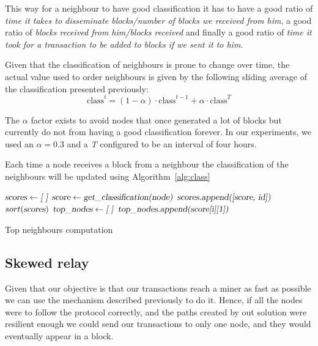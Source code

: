 \documentclass{dads}   %
\begin{document}
This way for a neighbour to have good classification it has to have a good ratio of \textsl{time it takes to disseminate blocks/number of blocks we received from him}, a good ratio of \textsl{blocks received from him/blocks received} and finally a good ratio of \textsl{time it took for a transaction to be added to blocks if we sent it to him}.

Given that the classification of neighbours is prone to change over time, the actual value used to order neighbours is given by the following sliding average of the classification presented previously:
\begin{displaymath} \mbox{class}^t = (1-\alpha) \cdot \mbox{class}^{t-1} + \alpha \cdot \mbox{class}^{T} \end{displaymath}

The $\alpha$ factor exists to avoid nodes that once generated a lot of blocks but currently do not from having a good classification forever. In our experiments, we used an $\alpha=0.3$ and a \textit{T} configured to be an interval of four hours.

Each time a node receives a block from a neighbour the classification of the neighbours will be updated using Algorithm~\ref{alg:class}

\begin{algorithm}[t]
\begin{algorithmic}[1]
\State $\textsl{scores} \gets \textsl{[ ]}$
  \State $\textsl{score} \gets \textsl{get\_classification(node)}$
  \State $\textsl{scores.append([score, id])}$
\EndFor
\State $sort(\textsl{scores})$
\State $\textsl{top\_nodes} \gets \textsl{[ ]}$
  \State $\textsl{top\_nodes.append(score[i][1])}$
\EndFor
\EndFunction
\end{algorithmic}
\caption{Top neighbours computation}
\label{alg:class}
\end{algorithm}
\subsection{Skewed relay}
\label{sec:sr}
Given that our objective is that our transactions reach a miner as fast as possible we can use the mechanism described previously to do it. Hence, if all the nodes were to follow the protocol correctly, and the paths created by out solution were resilient enough we could send our transactions to only one node, and they would eventually appear in a block.
\end{document}
